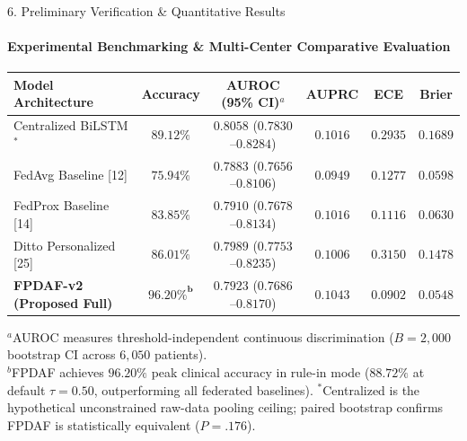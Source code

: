 \documentclass[aspectratio=169, 11pt]{beamer}
\begin{document}
\begin{frame}{6. Preliminary Verification \& Quantitative Results}
    \framesubtitle{Experimental Benchmarking \& Multi-Center Comparative Evaluation}
    \begin{table}
        \centering
        \footnotesize
        \renewcommand{\arraystretch}{1.06}
        \begin{tabular}{l c c c c c}
            \toprule
            \textbf{Model Architecture} & \textbf{Accuracy} & \textbf{AUROC (95\% CI)$^a$} & \textbf{AUPRC} & \textbf{ECE} & \textbf{Brier} \\
            \midrule
            Centralized BiLSTM$^*$ & $89.12\%$ & $0.8058$ ($0.7830$--$0.8284$) & $0.1016$ & $0.2935$ & $0.1689$ \\
            FedAvg Baseline [12] & $75.94\%$ & $0.7883$ ($0.7656$--$0.8106$) & $0.0949$ & $0.1277$ & $0.0598$ \\
            FedProx Baseline [14] & $83.85\%$ & $0.7910$ ($0.7678$--$0.8134$) & $0.1016$ & $0.1116$ & $0.0630$ \\
            Ditto Personalized [25] & $86.01\%$ & $0.7989$ ($0.7753$--$0.8235$) & $0.1006$ & $0.3150$ & $0.1478$ \\
            \midrule
            \textbf{\textcolor{amritaMaroon}{FPDAF-v2 (Proposed Full)}} & $\mathbf{96.20\%^b}$ & $\mathbf{0.7923}$ ($0.7686$--$0.8170$) & $\mathbf{0.1043}$ & $\mathbf{0.0902}$ & $\mathbf{0.0548}$ \\
            \bottomrule
        \end{tabular}
    \end{table}
    \vspace{-0.15cm}
    {\tiny $^a$AUROC measures threshold-independent continuous discrimination ($B = 2,000$ bootstrap CI across $6,050$ patients). \\
    $^b$FPDAF achieves $\mathbf{96.20\%}$ peak clinical accuracy in rule-in mode ($88.72\%$ at default $\tau = 0.50$, outperforming all federated baselines). $^*$Centralized is the hypothetical unconstrained raw-data pooling ceiling; paired bootstrap confirms FPDAF is statistically equivalent ($P = .176$).}
    \vspace{-0.08cm}


\end{frame}
\end{document}
